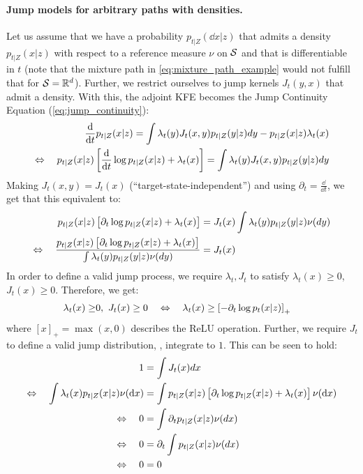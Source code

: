 \documentclass{fairmeta}
\numberwithin{equation}{section}
\begin{document}
\paragraph{Jump models for arbitrary paths with densities.}Let us assume that we have a probability $p_{t|Z}(\dd x|z)$ that admits a density $p_{t|Z}(x|z)$ with respect to a reference measure $\nu$ on ${\mathcal{S}}$ and that is differentiable in $t$ (note that the mixture path in \cref{eq:mixture_path_example} would not fulfill that for ${\mathcal{S}}=\mathbb{R}^d$). Further, we restrict ourselves to jump kernels $J_t(y,x)$ that admit a density. With this, the adjoint KFE becomes the Jump Continuity Equation (\cref{eq:jump_continuity}):
\begin{align}
    \frac{\mathrm{d}}{\mathrm{d}  t}p_{t|Z}(x|z)=\int \lambda_t(y)J_t(x,y)p_{t|Z}(y|z)dy-p_{t|Z}(x|z)\lambda_t(x)\\
    \Leftrightarrow \quad p_{t|Z}(x|z)\left [\frac{\mathrm{d}}{\mathrm{d}  t}\log p_{t|Z}(x|z)+\lambda_t(x)\right ]=\int \lambda_t(y)J_t(x,y)p_{t|Z}(y|z)dy
\end{align}
Making $J_t(x,y)=J_t(x)$ (``target-state-independent'') and using $\partial_t=\frac{\dd}{\dd t}$, we get that this equivalent to:
\begin{align}
    p_{t|Z}(x|z)\left [\partial_t\log p_{t|Z}(x|z)+\lambda_t(x)\right ]&=J_t(x)\int \lambda_t(y)p_{t|Z}(y|z)\nu(dy)\\
   \Leftrightarrow \quad \frac{p_{t|Z}(x|z)\left [\partial_t \log p_{t|Z}(x|z)+\lambda_t(x)\right ]}{\int \lambda_t(y)p_{t|Z}(y|z)\nu(dy)}&=J_t(x)
\end{align}
In order to define a valid jump process, we require $\lambda_t, J_t$ to satisfy $\lambda_t(x)\geq 0$, $J_t(x)\geq 0$. Therefore, we get:
\begin{align}
    \lambda_t(x) \geq& 0, \ J_t(x)\geq 0\quad 
    \Leftrightarrow \quad \lambda_t(x)\geq \left [-\partial_t\log p_t(x|z)\right ]_{+}
\end{align}
where $[x]_{+}=\max(x,0)$ describes the ReLU operation. Further, we require $J_t$ to define a valid jump distribution, \ie, integrate to $1$. This can be seen to hold:
\begin{align*}
    1 &= \int J_t(x) dx \\
    \Leftrightarrow \quad \int \lambda_t(x)p_{t|Z}(x|z)\nu(\mathrm{d} x) &= \int p_{t|Z}(x|z)\left [\partial_t\log p_{t|Z}(x|z)+\lambda_t(x)\right ]\nu(\mathrm{d} x)\\
    \Leftrightarrow \quad 0 &= \int \partial_t p_{t|Z}(x|z)\nu(dx)\\
    \Leftrightarrow \quad 0 &= \partial_t \int  p_{t|Z}(x|z)\nu(dx)\\
        \Leftrightarrow \quad 0 &= 0
\end{align*}
\end{document}
